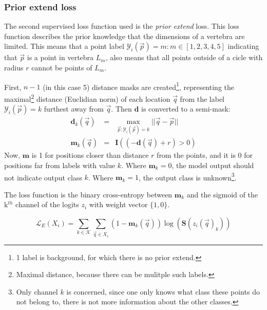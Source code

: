 \subsubsection{Prior extend loss}
The second supervised loss function used is the \textit{prior extend} loss.
This loss function describes the prior knowledge that the dimensions of a vertebra are limited. 
This means that a point label $\mathcal{Y}_i(\vec{p})=m: m\in[1,2,3,4,5]$ indicating that $\vec{p}$ is a point in vertebra $L_m$, also means that all points outside of a cicle with radius $r$ cannot be points of $L_m$.

First, $n-1$ (in this case 5) distance masks are created\footnote{1 label is background, for which there is no prior extend.}, 
representing the maximal\footnote{Maximal distance, because there can be mulitple such labels.} distance (Euclidian norm) of each location $\vec{q}$ from the label $\mathcal{Y}_i(\vec{p})=k$ furthest away from $\vec{q}$.
Then $\mathbf{d}$ is converted to a semi-mask:
\begin{eqnarray}
    \mathbf{d}_k(\vec{q}) &=& \max_{\vec{p}:\mathcal{Y}_i(\vec{p})=k}||\vec{q} - \vec{p}||\\
    \mathbf{m}_k(\vec{q}) &=& \mathbf{I}\left( (-\mathbf{d}(\vec{q}) + r) > 0 \right)
\end{eqnarray}
Now, $\mathbf{m}$ is 1 for positions closer than distance $r$ from the points, and it is 0 for positions far from labels with value $k$.
Where $\mathbf{m}_k=0$, the model output should not indicate output class $k$. Where $\mathbf{m}_k=1$, the output class is unknown\footnote{Only channel $k$ is concerned, since one only knows what class these points do not belong to, there is not more information about the other classes.}.

The loss function is the binary cross-entropy between $\mathbf{m}_k$ and the sigmoid of the k$^{th}$ channel of the logits $z_i$ with weight vector $\{1, 0\}$.

\begin{equation}
    \mathcal{L}_E(X_i) = \sum_{k\in\mathcal{K}}\sum_{\vec{q}\in X_i}  (1-\mathbf{m}_k(\vec{q})) \log(\mathbf{S}(z_i(\vec{q})_k)) 
\end{equation}



